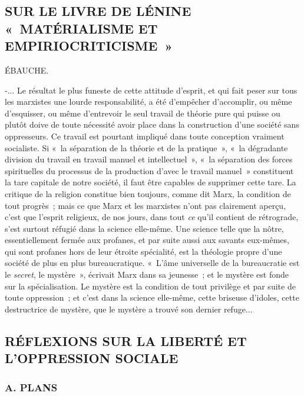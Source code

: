 \documentclass[french,twoside]{book} %
\begin{document}
\subsection[SUR LE LIVRE DE LÉNINE « MATÉRIALISME ET EMPIRIOCRITICISME »]{SUR LE LIVRE DE LÉNINE « MATÉRIALISME ET EMPIRIOCRITICISME »}

\begin{center}
ÉBAUCHE.\end{center}
 -... Le résultat le plus funeste de cette attitude d'esprit, et qui fait peser sur tous les marxistes une lourde responsabilité, a été d'empêcher d'accomplir, ou même d'esquisser, ou même d'entrevoir le seul travail de théorie pure qui puisse ou plutôt doive de toute nécessité avoir place dans la construction d'une société sans oppresseurs. Ce travail est pourtant impliqué dans toute conception vraiment socialiste. Si « la séparation de la théorie et de la pratique », « la dégradante division du travail en travail manuel et intellectuel », « la séparation des forces spirituelles du processus de la production d'avec le travail manuel » constituent la tare capitale de notre société, il faut être capables de supprimer cette tare. La critique de la religion constitue bien toujours, comme dit Marx, la condition de tout progrès ; mais ce que Marx et les marxistes n'ont pas clairement aperçu, c'est que l'esprit religieux, de nos jours, dans tout {\itshape ce} qu'il contient de rétrograde, s'est surtout réfugié dans la science elle-même. Une science telle que la nôtre, essentiellement fermée aux profanes, et par suite aussi aux savants eux-mêmes, qui sont profanes hors de leur étroite spécialité, est la théologie propre d'une société de plus en plus bureaucratique. « L'âme universelle de la bureaucratie est le {\itshape secret}, le mystère », écrivait Marx dans sa jeunesse ; et le mystère est fonde sur la spécialisation. Le mystère est la condition de tout privilège et par suite de toute oppression ; et c’est dans la science elle-même, cette briseuse d'idoles, cette destructrice de mystère, que le mystère a trouvé son dernier refuge...
\subsection[RÉFLEXIONS SUR LA LIBERTÉ ET L'OPPRESSION SOCIALE]{RÉFLEXIONS SUR LA LIBERTÉ ET L'OPPRESSION SOCIALE}
\subsubsection[A. PLANS]{A. PLANS}
\end{document}
